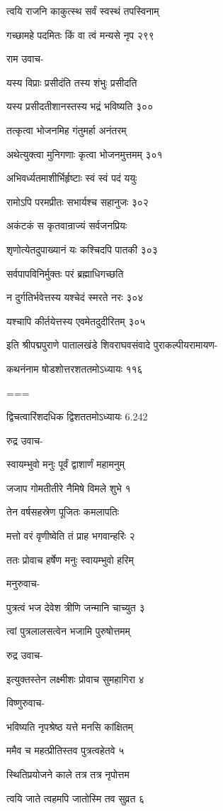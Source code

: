 त्वयि राजनि काकुत्स्थ सर्वं स्वस्थं तपस्विनाम्

गच्छामहे पदमितः किं वा त्वं मन्यसे नृप २९९

राम उवाच-

यस्य विप्राः प्रसीदंति तस्य शंभुः प्रसीदति

यस्य प्रसीदतीशानस्तस्य भद्रं भविष्यति ३००

तत्कृत्वा भोजनमिह गंतुमर्हा अनंतरम्

अथेत्युक्त्वा मुनिगणाः कृत्वा भोजनमुत्तमम् ३०१

अभिवर्ध्यतमाशीर्भिर्हृष्टाः स्वं स्वं पदं ययुः

रामोऽपि परमप्रीतः सभार्यश्च सहानुजः ३०२

अकंटकं स कृतवान्राज्यं सर्वजनप्रियः

शृणोत्येतदुपाख्यानं यः कश्चिदपि पातकी ३०३

सर्वपापविनिर्मुक्तः परं ब्रह्माधिगच्छति

न दुर्गतिर्भवेत्तस्य यश्चेदं स्मरते नरः ३०४

यश्चापि कीर्तयेत्तस्य एवमेतदुदीरितम् ३०५

इति श्रीपद्मपुराणे पातालखंडे शिवराघवसंवादे पुराकल्पीयरामायण-

कथनंनाम षोडशोत्तरशततमोऽध्यायः ११६


===

द्विचत्वारिंशदधिक द्विशततमोऽध्यायः 6.242

रुद्र उवाच-

स्वायम्भुवो मनुः पूर्वं द्वाशार्णं महामनुम्

जजाप गोमतीतीरे नैमिषे विमले शुभे १

तेन वर्षसहस्रेण पूजितः कमलापतिः

मत्तो वरं वृणीष्वेति तं प्राह भगवान्हरिः २

ततः प्रोवाच हर्षेण मनुः स्वायम्भुवो हरिम्

मनुरुवाच-

पुत्रत्वं भज देवेश त्रीणि जन्मानि चाच्युत ३

त्वां पुत्रलालसत्वेन भजामि पुरुषोत्तमम्

रुद्र उवाच-

इत्युक्तस्तेन लक्ष्मीशः प्रोवाच सुमहागिरा ४

विष्णुरुवाच-

भविष्यति नृपश्रेष्ठ यत्ते मनसि कांक्षितम्

ममैव च महत्प्रीतिस्तव पुत्रत्वहेतवे ५

स्थितिप्रयोजने काले तत्र तत्र नृपोत्तम

त्वयि जाते त्वहमपि जातोस्मि तव सुव्रत ६

